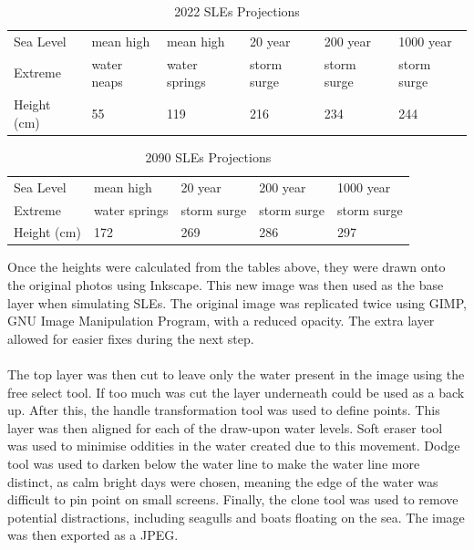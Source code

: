 \begin{table}[h!]
    \centering
    \begin{tabular}{|l|l|l|l|l|l|}
    \hline
     Sea Level &   mean high  & mean high  & 20 year  & 200 year   & 1000 year  \\ \newline
     Extreme &  water neaps & water springs &  storm surge  & storm surge  &  storm surge  \\ \hline
       Height (cm) &  55 & 119 & 216 & 234 & 244 \\ \hline
    \end{tabular}
    \caption{2022 SLEs Projections \cite{kartverket_se_2020}}
    \label{2022_sle_projections}
\end{table}

\begin{table}[h!]
    \centering
    \begin{tabular}{|l|l|l|l|l|}
    \hline
       Sea Level &  mean high & 20 year   & 200 year &  1000 year   \\ \newline
       Extreme & water springs &  storm surge  &  storm surge  &  storm surge  \\ \hline
       Height (cm) & 172 & 269 & 286 & 297 \\ \hline
    \end{tabular}
    \caption{2090 SLEs Projections \cite{kartverket_se_2020}}
    \label{2090_sle_projections}
\end{table}

Once the heights were calculated from the tables above, they were drawn onto the original photos using Inkscape. This new image was then used as the base layer when simulating SLEs. The original image was replicated twice using GIMP, GNU Image Manipulation Program, with a reduced opacity. The extra layer allowed for easier fixes during the next step. 
\paragraph{}
The top layer was then cut to leave only the water present in the image using the free select tool. If too much was cut the layer underneath could be used as a back up. After this, the handle transformation tool was used to define points. This layer was then aligned for each of the draw-upon water levels. Soft eraser tool was used to minimise oddities in the water created due to this movement. Dodge tool was used to darken below the water line to make the water line more distinct, as calm bright days were chosen, meaning the edge of the water was difficult to pin point on small screens. Finally, the clone tool was used to remove potential distractions, including seagulls and boats floating on the sea. The image was then exported as a JPEG. 

